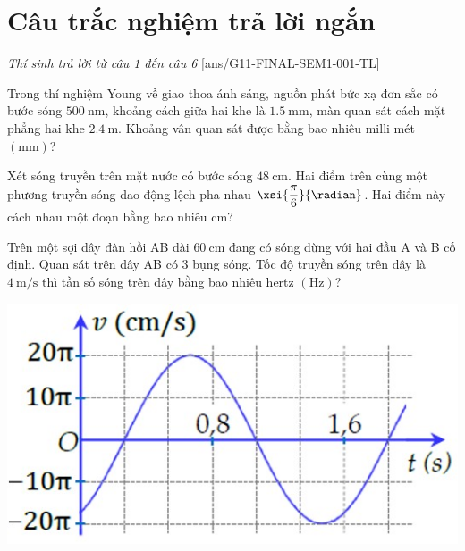 \section{Câu trắc nghiệm trả lời ngắn} \textit{Thí sinh trả lời từ câu 1 đến câu 6}
\setcounter{ex}{0}
[ans/G11-FINAL-SEM1-001-TL]
\begin{ex}
Trong thí nghiệm Young về giao thoa ánh sáng, nguồn phát bức xạ đơn sắc có bước sóng $\SI{500}{\nano\meter}$, khoảng cách giữa hai khe là $\SI{1.5}{\milli\meter}$, màn quan sát cách mặt phẳng hai khe $\SI{2.4}{\meter}$. Khoảng vân quan sát được bằng bao nhiêu milli mét $\left(\si{\milli\meter}\right)$? 
\end{ex}
\begin{ex}
Xét sóng truyền trên mặt nước có bước sóng $\SI{48}{\centi\meter}$. Hai điểm trên cùng một phương truyền sóng dao động lệch pha nhau $\xsi{\dfrac{\pi}{6}}{\radian}$. Hai điểm này cách nhau một đoạn bằng bao nhiêu $\si{\centi\meter}$?
\end{ex}
\begin{ex}
Trên một sợi dây đàn hồi AB dài $\SI{60}{\centi\meter}$ đang có sóng dừng với hai đầu A và B cố định. Quan sát trên dây AB có 3 bụng sóng. Tốc độ truyền sóng trên dây là $\SI{4}{\meter/\second}$ thì tần số sóng trên dây bằng bao nhiêu hertz $\left(\si{\hertz}\right)$? 
\end{ex}
\begin{ex}
	{\vspace{-0.5cm}\includegraphics[scale=0.5]{../figs/G11-FINAL-SEM1-001-4}}
\end{ex}
